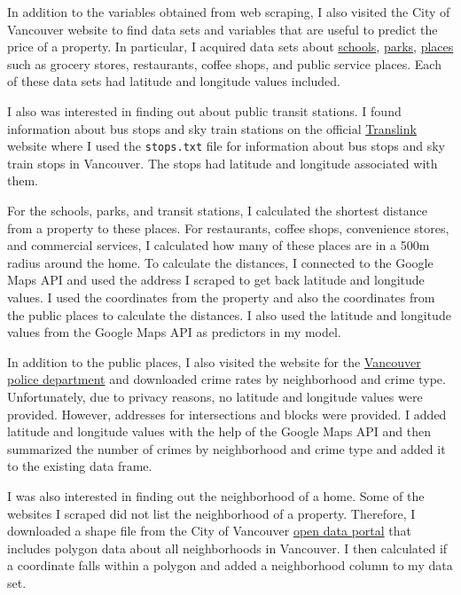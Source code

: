 \documentclass[
]{article}
\begin{document}
In addition to the variables obtained from web scraping, I also visited
the City of Vancouver website to find data sets and variables that are
useful to predict the price of a property. In particular, I acquired
data sets about
\href{https://opendata.vancouver.ca/explore/dataset/schools/table/}{schools},
\href{https://opendata.vancouver.ca/explore/dataset/parks-polygon-representation/table/}{parks},
\href{https://opendata.vancouver.ca/explore/dataset/storefronts-inventory/table/}{places}
such as grocery stores, restaurants, coffee shops, and public service
places. Each of these data sets had latitude and longitude values
included.

I also was interested in finding out about public transit stations. I
found information about bus stops and sky train stations on the official
\href{(https://www.translink.ca/about-us/doing-business-with-translink/app-developer-resources/gtfs/gtfs-data)}{Translink}
website where I used the \texttt{stops.txt} file for information about
bus stops and sky train stops in Vancouver. The stops had latitude and
longitude associated with them.

For the schools, parks, and transit stations, I calculated the shortest
distance from a property to these places. For restaurants, coffee shops,
convenience stores, and commercial services, I calculated how many of
these places are in a 500m radius around the home. To calculate the
distances, I connected to the Google Maps API and used the address I
scraped to get back latitude and longitude values. I used the
coordinates from the property and also the coordinates from the public
places to calculate the distances. I also used the latitude and
longitude values from the Google Maps API as predictors in my model.

In addition to the public places, I also visited the website for the
\href{https://geodash.vpd.ca/opendata/}{Vancouver police department} and
downloaded crime rates by neighborhood and crime type. Unfortunately,
due to privacy reasons, no latitude and longitude values were provided.
However, addresses for intersections and blocks were provided. I added
latitude and longitude values with the help of the Google Maps API and
then summarized the number of crimes by neighborhood and crime type and
added it to the existing data frame.

I was also interested in finding out the neighborhood of a home. Some of
the websites I scraped did not list the neighborhood of a property.
Therefore, I downloaded a shape file from the City of Vancouver
\href{https://opendata.vancouver.ca/explore/dataset/local-area-boundary/table/?disjunctive.name}{open
data portal} that includes polygon data about all neighborhoods in
Vancouver. I then calculated if a coordinate falls within a polygon and
added a neighborhood column to my data set.
\end{document}
